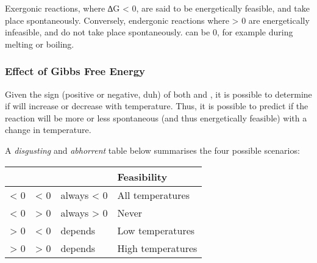 			Exergonic reactions, where ∆G < 0, are said to be energetically feasible, and take place spontaneously. Conversely, endergonic
			reactions where \gibb{} > 0 are energetically infeasible, and do not take place spontaneously. \gibb{} can be 0, for example during
			melting or boiling.


			\pagebreak
			\subsubsection{Effect of Gibbs Free Energy}

				Given the sign (positive or negative, duh) of both \enth{} and \entr{}, it is possible to determine if \gibb{} will increase
				or decrease with temperature. Thus, it is possible to predict if the reaction will be more or less spontaneous
				(and thus energetically feasible) with a change in temperature.

				A \emph{disgusting} and \emph{abhorrent} table below summarises the four possible scenarios:

				\begin{center}\begin{table}[htb]\renewcommand{\arraystretch}{1.5}
				\begin{tabu} to \textwidth {| X[c,m] | X[c,m] | X[c,m] | X[c,m] |}

					\hline		\enth{}		&	\entr{}		&	\gibb{}		&		Feasibility			\\

					\hline		< 0			&	< 0			&	always < 0	&		All temperatures	\\
					\hline		< 0			&	> 0			&	always > 0	&				Never		\\
					\hline		> 0			&	< 0			&	depends		&		Low temperatures	\\
					\hline		> 0			&	> 0			&	depends		&		High temperatures	\\
					\hline

				\end{tabu}
				\end{table}\end{center}\vspace{-10mm}





















































